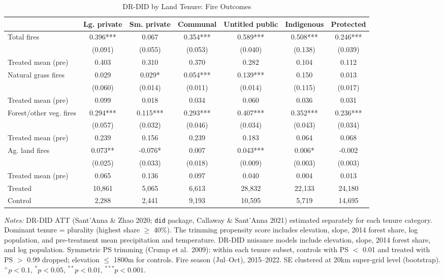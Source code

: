 \begin{table}[t!]
\centering
\small
\caption{DR-DID by Land Tenure: Fire Outcomes}
\label{tab:did_drdid_fire_byland}
\begin{tabular}{lcccccc}
\toprule
 & Lg. private & Sm. private & Communal & Untitled public & Indigenous & Protected \\
\midrule
Total fires & 0.396*** & 0.067 & 0.354*** & 0.589*** & 0.508*** & 0.246*** \\
 & (0.091) & (0.055) & (0.053) & (0.040) & (0.138) & (0.039) \\
Treated mean (pre) & 0.403 & 0.310 & 0.370 & 0.282 & 0.104 & 0.112 \\
[0.5em]
Natural grass fires & 0.029 & 0.029* & 0.054*** & 0.139*** & 0.150 & 0.013 \\
 & (0.060) & (0.014) & (0.011) & (0.014) & (0.115) & (0.017) \\
Treated mean (pre) & 0.099 & 0.018 & 0.034 & 0.060 & 0.036 & 0.031 \\
[0.5em]
Forest/other veg. fires & 0.294*** & 0.115*** & 0.293*** & 0.407*** & 0.352*** & 0.236*** \\
 & (0.057) & (0.032) & (0.046) & (0.034) & (0.043) & (0.034) \\
Treated mean (pre) & 0.239 & 0.156 & 0.239 & 0.183 & 0.064 & 0.068 \\
[0.5em]
Ag. land fires & 0.073** & -0.076* & 0.007 & 0.043*** & 0.006* & -0.002 \\
 & (0.025) & (0.033) & (0.018) & (0.009) & (0.003) & (0.003) \\
Treated mean (pre) & 0.065 & 0.136 & 0.097 & 0.040 & 0.004 & 0.013 \\
\midrule
Treated & 10,861 & 5,065 & 6,613 & 28,832 & 22,133 & 24,180 \\
Control & 2,288 & 2,441 & 9,193 & 10,595 & 5,719 & 14,695 \\
\bottomrule
\end{tabular}
\begin{tablenotes}[flushleft]
\small
\item \textit{Notes:} DR-DID ATT (Sant'Anna \& Zhao 2020; \texttt{did} package, Callaway \& Sant'Anna 2021) estimated separately for each tenure category. Dominant tenure = plurality (highest share $\geq$ 40\%). The trimming propensity score includes elevation, slope, 2014 forest share, log population, and pre-treatment mean precipitation and temperature. DR-DID nuisance models include elevation, slope, 2014 forest share, and log population. Symmetric PS trimming (Crump et al.\ 2009): within each tenure subset, controls with PS $<$ 0.01 and treated with PS $>$ 0.99 dropped; elevation $\leq$ 1800m for controls. Fire season (Jul--Oct), 2015--2022. SE clustered at 20km super-grid level (bootstrap). $^{+}p<0.1$, $^{*}p<0.05$, $^{**}p<0.01$, $^{***}p<0.001$.
\end{tablenotes}
\end{table}
